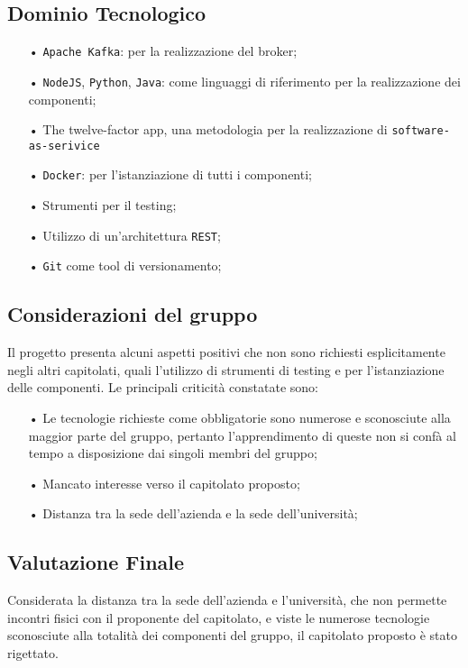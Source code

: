 \subsection{Dominio Tecnologico}
\begin{itemize}
\item[•] \texttt{Apache Kafka}: per la realizzazione del broker;
\item[•] \texttt{NodeJS}, \texttt{Python}, \texttt{Java}: come linguaggi di riferimento per la realizzazione dei componenti;
\item[•] The twelve-factor app, una metodologia per la realizzazione di \texttt{software-as-serivice}
\item[•] \texttt{Docker}: per l’istanziazione di
tutti i componenti;
\item[•] Strumenti per il testing;
\item[•] Utilizzo di un'architettura \texttt{REST};
\item[•] \texttt{Git} come tool di versionamento; 

\end{itemize}
\subsection{Considerazioni del gruppo}

Il progetto presenta alcuni aspetti positivi che non sono richiesti esplicitamente negli altri capitolati, quali l'utilizzo di strumenti di testing e per l'istanziazione delle componenti. 
Le principali criticità constatate sono:
\begin{itemize}
\item[•] Le tecnologie richieste come obbligatorie sono numerose e sconosciute alla maggior parte del gruppo, pertanto l'apprendimento di queste non si confà al tempo a disposizione dai singoli membri del gruppo; 
\item[•] Mancato interesse verso il capitolato proposto;
\item[•] Distanza tra la sede dell'azienda e la sede dell'università;
\end{itemize}

\subsection{Valutazione Finale}
Considerata la distanza tra la sede dell'azienda e l'università, che non permette incontri fisici con il proponente del capitolato, e viste le numerose tecnologie sconosciute alla totalità dei componenti del gruppo, il capitolato proposto è stato rigettato.

